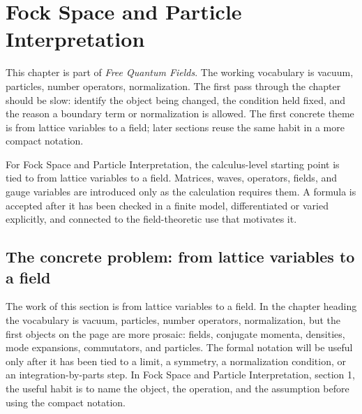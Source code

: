 \chapter{Fock Space and Particle Interpretation}


This chapter is part of \emph{Free Quantum Fields}.  The working vocabulary is vacuum, particles, number operators, normalization.  The first pass through the chapter should be slow: identify the object being changed, the condition held fixed, and the reason a boundary term or normalization is allowed.  The first concrete theme is from lattice variables to a field; later sections reuse the same habit in a more compact notation.

For Fock Space and Particle Interpretation, the calculus-level starting point is tied to from lattice variables to a field.  Matrices, waves, operators, fields, and gauge variables are introduced only as the calculation requires them.  A formula is accepted after it has been checked in a finite model, differentiated or varied explicitly, and connected to the field-theoretic use that motivates it.

\section{The concrete problem: from lattice variables to a field}













The work of this section is from lattice variables to a field.  In the chapter heading the vocabulary is vacuum, particles, number operators, normalization, but the first objects on the page are more prosaic: fields, conjugate momenta, densities, mode expansions, commutators, and particles.  The formal notation will be useful only after it has been tied to a limit, a symmetry, a normalization condition, or an integration-by-parts step.  In Fock Space and Particle Interpretation, section 1, the useful habit is to name the object, the operation, and the assumption before using the compact notation.


